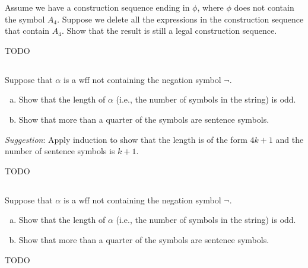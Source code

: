 \documentclass{report}
\begin{document}
Assume we have a construction sequence ending in $\phi$, where $\phi$ does not
  contain the symbol $A_4$.
Suppose we delete all the expressions in the construction sequence that contain
  $A_4$.
Show that the result is still a legal construction sequence.

\begin{answer}

  TODO

\end{answer}

\subsection{}%

Suppose that $\alpha$ is a wff not containing the negation symbol $\neg$.
\begin{enumerate}[(a)]
  \item Show that the length of $\alpha$ (i.e., the number of symbols in the
    string) is odd.
  \item Show that more than a quarter of the symbols are sentence symbols.
\end{enumerate}
\textit{Suggestion}: Apply induction to show that the length is of the form
  $4k + 1$ and the number of sentence symbols is $k + 1$.

\begin{answer}

  TODO

\end{answer}

\subsection{}%

Suppose that $\alpha$ is a wff not containing the negation symbol $\neg$.
\begin{enumerate}[(a)]
  \item Show that the length of $\alpha$ (i.e., the number of symbols in the
    string) is odd.
  \item Show that more than a quarter of the symbols are sentence symbols.
\end{enumerate}

\begin{answer}

  TODO

\end{answer}
\end{document}
